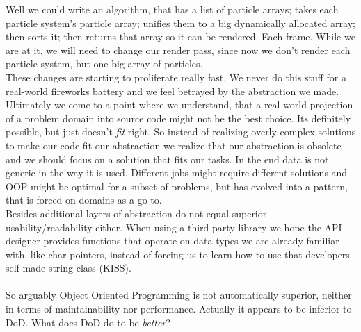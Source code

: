 Well we could write an algorithm, that has a list of particle arrays; takes each particle system's particle array; unifies them to a big dynamically allocated array; then sorts it; then returns that array so it can be rendered. Each frame. While we are at it, we will need to change our render pass, since now we don't render each particle system, but one big array of particles.\\
These changes are starting to proliferate really fast. We never do this stuff for a real-world fireworks battery and we feel betrayed by the abstraction we made. Ultimately we come to a point where we understand, that a real-world projection of a problem domain into source code might not be the best choice. Its definitely possible, but just doesn't \textit{fit} right. So instead of realizing overly complex solutions to make our code fit our abstraction we realize that our abstraction is obsolete and we should focus on a solution that fits our tasks. In the end data is not generic in the way it is used. Different jobs might require different solutions and OOP might be optimal for a subset of problems, but has evolved into a pattern, that is forced on domains as a go to.\\
Besides additional layers of abstraction do not equal superior usability/readability either. When using a third party library we hope the API designer provides functions that operate on data types we are already familiar with, like char pointers, instead of forcing us to learn how to use that developers self-made string class (KISS).\\\\
So arguably Object Oriented Programming is not automatically superior, neither in terms of maintainability nor performance. Actually it appears to be inferior to DoD. What does DoD do to be \textit{better}?


